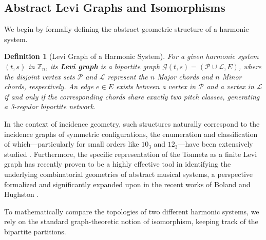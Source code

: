 \documentclass[11pt,letterpaper]{amsart}
\newcommand{\Z}{\mathbb{Z}}
\newtheorem{definition}{Definition}
\begin{document}
\subsection{Abstract Levi Graphs and Isomorphisms}

We begin by formally defining the abstract geometric structure of a harmonic system.

\begin{definition}[Levi Graph of a Harmonic System]
For a given harmonic system $(t,s)$ in $\Z_n$, its \textbf{Levi graph} is a bipartite graph $\mathcal{G}(t,s) = (\mathcal{P} \cup \mathcal{L}, E)$, where the disjoint vertex sets $\mathcal{P}$ and $\mathcal{L}$ represent the $n$ Major chords and $n$ Minor chords, respectively. An edge $e \in E$ exists between a vertex in $\mathcal{P}$ and a vertex in $\mathcal{L}$ if and only if the corresponding chords share exactly two pitch classes, generating a 3-regular bipartite network.
\end{definition}

In the context of incidence geometry, such structures naturally correspond to the incidence graphs of symmetric configurations, the enumeration and classification of which---particularly for small orders like $10_3$ and $12_3$---have been extensively studied \cite{betten_configurations, alazemi_12_3}. Furthermore, the specific representation of the Tonnetz as a finite Levi graph has recently proven to be a highly effective tool in identifying the underlying combinatorial geometries of abstract musical systems, a perspective formalized and significantly expanded upon in the recent works of Boland and Hughston \cite{boland_hughston_2025, boland_hughston_2026}.

To mathematically compare the topologies of two different harmonic systems, we rely on the standard graph-theoretic notion of isomorphism, keeping track of the bipartite partitions.


\end{document}
